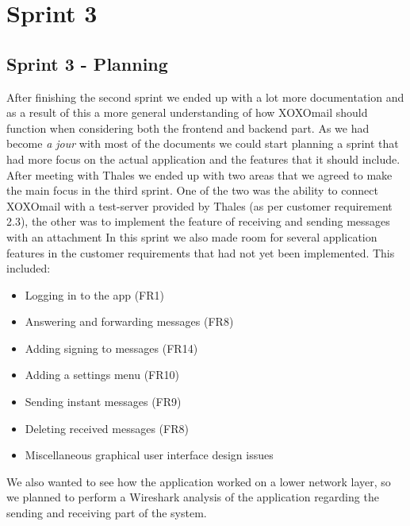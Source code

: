 \chapter{Sprint 3}

\section{Sprint 3 - Planning}
After finishing the second sprint we ended up with a lot more documentation and as a result of this a more general understanding of how XOXOmail should function when considering both the frontend and backend part. As we had become \textit{a jour} with most of the documents we could start planning a sprint that had more focus on the actual application and the features that it should include. 
\newline
\newline
After meeting with Thales we ended up with two areas that we agreed to make the main focus in the third sprint. One of the two was the ability to connect XOXOmail with a test-server provided by Thales (as per customer requirement 2.3), the other was to implement the feature of receiving and sending messages with an attachment
\newline
\newline
In this sprint we also made room for several application features in the customer requirements that had not yet been implemented. This included:
\begin{itemize}
\item{}Logging in to the app (FR1)
\item{}Answering and forwarding messages (FR8)
\item{}Adding signing to messages (FR14)
\item{}Adding a settings menu (FR10)
\item{}Sending instant messages (FR9)
\item{}Deleting received messages (FR8)
\item{}Miscellaneous graphical user interface design issues
\end{itemize}

We also wanted to see how the application worked on a lower network layer, so we planned to perform a Wireshark analysis of the application regarding the sending and receiving part of the system. 

\newpage

